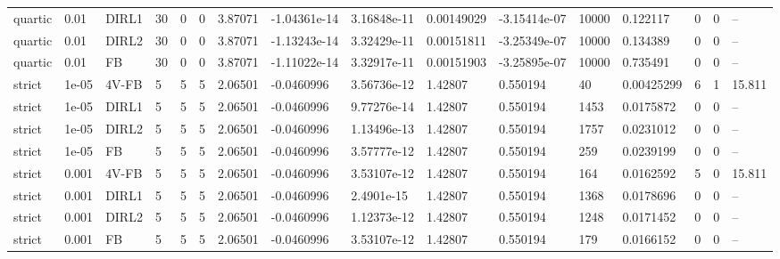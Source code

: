\begin{tabular}{llllllllllllllll}
quartic & 0.01 & DIRL1 & 30 & 0 & 0 & 3.87071 & -1.04361e-14 & 3.16848e-11 & 0.00149029 & -3.15414e-07 & 10000 & 0.122117 & 0 & 0 & -- \\
quartic & 0.01 & DIRL2 & 30 & 0 & 0 & 3.87071 & -1.13243e-14 & 3.32429e-11 & 0.00151811 & -3.25349e-07 & 10000 & 0.134389 & 0 & 0 & -- \\
quartic & 0.01 & FB & 30 & 0 & 0 & 3.87071 & -1.11022e-14 & 3.32917e-11 & 0.00151903 & -3.25895e-07 & 10000 & 0.735491 & 0 & 0 & -- \\
strict & 1e-05 & 4V-FB & 5 & 5 & 5 & 2.06501 & -0.0460996 & 3.56736e-12 & 1.42807 & 0.550194 & 40 & 0.00425299 & 6 & 1 & 15.811 \\
strict & 1e-05 & DIRL1 & 5 & 5 & 5 & 2.06501 & -0.0460996 & 9.77276e-14 & 1.42807 & 0.550194 & 1453 & 0.0175872 & 0 & 0 & -- \\
strict & 1e-05 & DIRL2 & 5 & 5 & 5 & 2.06501 & -0.0460996 & 1.13496e-13 & 1.42807 & 0.550194 & 1757 & 0.0231012 & 0 & 0 & -- \\
strict & 1e-05 & FB & 5 & 5 & 5 & 2.06501 & -0.0460996 & 3.57777e-12 & 1.42807 & 0.550194 & 259 & 0.0239199 & 0 & 0 & -- \\
strict & 0.001 & 4V-FB & 5 & 5 & 5 & 2.06501 & -0.0460996 & 3.53107e-12 & 1.42807 & 0.550194 & 164 & 0.0162592 & 5 & 0 & 15.811 \\
strict & 0.001 & DIRL1 & 5 & 5 & 5 & 2.06501 & -0.0460996 & 2.4901e-15 & 1.42807 & 0.550194 & 1368 & 0.0178696 & 0 & 0 & -- \\
strict & 0.001 & DIRL2 & 5 & 5 & 5 & 2.06501 & -0.0460996 & 1.12373e-12 & 1.42807 & 0.550194 & 1248 & 0.0171452 & 0 & 0 & -- \\
strict & 0.001 & FB & 5 & 5 & 5 & 2.06501 & -0.0460996 & 3.53107e-12 & 1.42807 & 0.550194 & 179 & 0.0166152 & 0 & 0 & -- \\
\bottomrule
\end{tabular}
